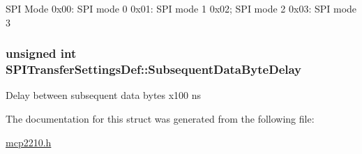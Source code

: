\-S\-P\-I \-Mode 0x00\-: \-S\-P\-I mode 0 0x01\-: \-S\-P\-I mode 1 0x02; \-S\-P\-I mode 2 0x03\-: \-S\-P\-I mode 3 \hypertarget{struct_s_p_i_transfer_settings_def_a7692386eb70c3fd674c1a0fdbe7a62c2}{
\subsubsection[{\-Subsequent\-Data\-Byte\-Delay}]{\setlength{\rightskip}{0pt plus 5cm}unsigned int {\bf \-S\-P\-I\-Transfer\-Settings\-Def\-::\-Subsequent\-Data\-Byte\-Delay}}}\label{struct_s_p_i_transfer_settings_def_a7692386eb70c3fd674c1a0fdbe7a62c2}
\-Delay between subsequent data bytes x100 ns 

\-The documentation for this struct was generated from the following file\-:\begin{DoxyCompactItemize}
\item 
\hyperlink{mcp2210_8h}{mcp2210.\-h}\end{DoxyCompactItemize}
